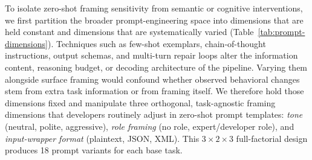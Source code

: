 \documentclass[a4paper,fleqn]{cas-sc}
\begin{document}
To isolate zero-shot framing sensitivity from semantic or cognitive interventions, we first partition the broader prompt-engineering space into dimensions that are held constant and dimensions that are systematically varied (Table~\ref{tab:prompt-dimensions}). Techniques such as few-shot exemplars, chain-of-thought instructions, output schemas, and multi-turn repair loops alter the information content, reasoning budget, or decoding architecture of the pipeline. Varying them alongside surface framing would confound whether observed behavioral changes stem from extra task information or from framing itself. We therefore hold those dimensions fixed and manipulate three orthogonal, task-agnostic framing dimensions that developers routinely adjust in zero-shot prompt templates: \emph{tone} (neutral, polite, aggressive), \emph{role framing} (no role, expert/developer role), and \emph{input-wrapper format} (plaintext, JSON, XML). This $3 \times 2 \times 3$ full-factorial design produces 18 prompt variants for each base task.
\end{document}
